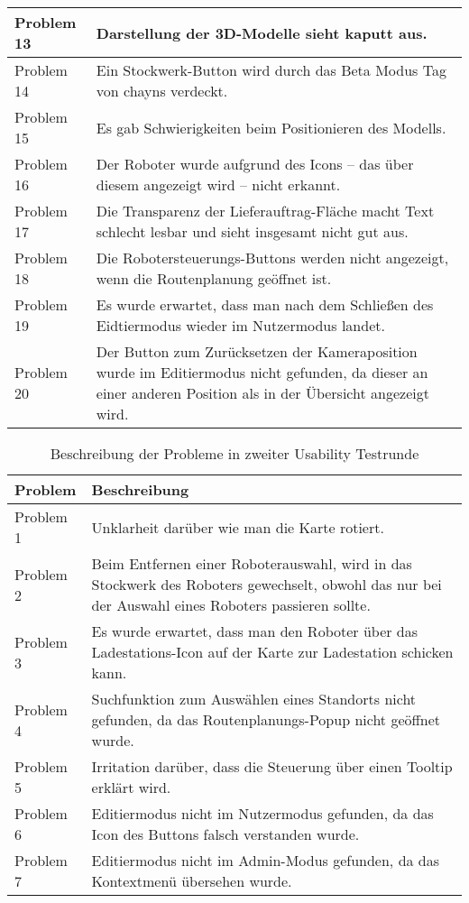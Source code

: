 \begin{table}[H]
\begin{tabular}{l|l}
        Problem 13  & \multicolumn{1}{p{12cm}}{Darstellung der 3D-Modelle sieht kaputt aus.} \\ \hline
        Problem 14  & \multicolumn{1}{p{12cm}}{Ein Stockwerk-Button wird durch das Beta Modus Tag von chayns verdeckt.} \\ \hline
        Problem 15  & \multicolumn{1}{p{12cm}}{Es gab Schwierigkeiten beim Positionieren des Modells.} \\ \hline
        Problem 16  & \multicolumn{1}{p{12cm}}{Der Roboter wurde aufgrund des Icons – das über diesem angezeigt wird – nicht erkannt.} \\ \hline
        Problem 17  & \multicolumn{1}{p{12cm}}{Die Transparenz der Lieferauftrag-Fläche macht Text schlecht lesbar und sieht insgesamt nicht gut aus.} \\ \hline
        Problem 18  & \multicolumn{1}{p{12cm}}{Die Robotersteuerungs-Buttons werden nicht angezeigt, wenn die Routenplanung geöffnet ist.} \\ \hline
        Problem 19  & \multicolumn{1}{p{12cm}}{Es wurde erwartet, dass man nach dem Schließen des Eidtiermodus wieder im Nutzermodus landet.} \\ \hline
        Problem 20  & \multicolumn{1}{p{12cm}}{Der Button zum Zurücksetzen der Kameraposition wurde im Editiermodus nicht gefunden, da dieser an einer anderen Position als in der Übersicht angezeigt wird.} \\
    \end{tabular}
\end{table}
\begin{table}[H]
    \caption{Beschreibung der Probleme in zweiter Usability Testrunde}\label{tbl:2ndUsabilityTestsProblemsDesc}
    \begin{tabular}{l|l}
        Problem     & Beschreibung \\ \hline
        Problem 1   & \multicolumn{1}{p{12cm}}{Unklarheit darüber wie man die Karte rotiert.} \\ \hline
        Problem 2   & \multicolumn{1}{p{12cm}}{Beim Entfernen einer Roboterauswahl, wird in das Stockwerk des Roboters gewechselt, obwohl das nur bei der Auswahl eines Roboters passieren sollte.} \\ \hline
        Problem 3   & \multicolumn{1}{p{12cm}}{Es wurde erwartet, dass man den Roboter über das Ladestations-Icon auf der Karte zur Ladestation schicken kann.} \\ \hline
        Problem 4   & \multicolumn{1}{p{12cm}}{Suchfunktion zum Auswählen eines Standorts nicht gefunden, da das Routenplanungs-Popup nicht geöffnet wurde.} \\ \hline
        Problem 5   & \multicolumn{1}{p{12cm}}{Irritation darüber, dass die Steuerung über einen Tooltip erklärt wird.} \\ \hline
        Problem 6   & \multicolumn{1}{p{12cm}}{Editiermodus nicht im Nutzermodus gefunden, da das Icon des Buttons falsch verstanden wurde.} \\ \hline
        Problem 7   & \multicolumn{1}{p{12cm}}{Editiermodus nicht im Admin-Modus gefunden, da das Kontextmenü übersehen wurde.}
    \end{tabular}
\end{table}
